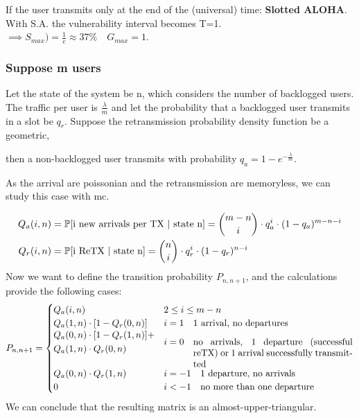 If the user transmits only at the end of the (universal) time: \textbf{Slotted ALOHA}.
With S.A. the vulnerability interval becomes T=1. $\implies S_{max})=\frac{1}{e} \approx 37\% \quad G_{max} = 1$.

\subsubsection{Suppose m users}
Let the state of the system be n, which considers the number of backlogged users.
The traffic per user is $\frac{\lambda}{m}$ and let the probability that a backlogged
user transmits in a slot be $q_r$. Suppose the retransmission probability density function be a geometric,

then a non-backlogged user transmits with probability $q_a = 1-e^{-\frac{\lambda}{m}}$.

As the arrival are poissonian and the retransmission are memoryless, we can study this case with \gls{mc}.

\begin{equation}\begin{split}
  Q_a(i,n) &= \mathbb{P}[\text{i new arrivals per TX | state n}] = \binom{m-n}{i} \cdot q_a^i \cdot (1-q_a)^{m-n-i} \\
  Q_r(i,n) &= \mathbb{P}[\text{i ReTX | state n}] = \binom{n}{i} \cdot q_r^i \cdot (1-q_r)^{n-i} \\
\end{split}\end{equation}
Now we want to define the transition probability $P_{n,n+1}$, and the calculations provide the following cases:
\begin{equation}
  P_{n,n+1} = \begin{cases}
    Q_a(i,n) & 2 \le i \le m-n \\
    Q_a(1,n) \cdot [1-Q_r(0,n)] & i=1 \quad \text{1 arrival, no departures}\\
    \begin{aligned}
    & Q_a(0,n) \cdot [1-Q_r(1,n)] + \\ & Q_a(1,n)\cdot Q_r(0,n)
    \end{aligned}& i=0 \quad \parbox[t]{0.5\textwidth}{no arrivals, 1 departure (successful reTX) or 1 arrival successfully transmitted }\\
    Q_a(0,n)\cdot Q_r(1,n) & i = -1 \quad \text{1 departure, no arrivals}\\
    0 & i < -1 \quad \text{no more than one departure}
  \end{cases}
\end{equation}
We can conclude that the resulting matrix is an almost-upper-triangular.

